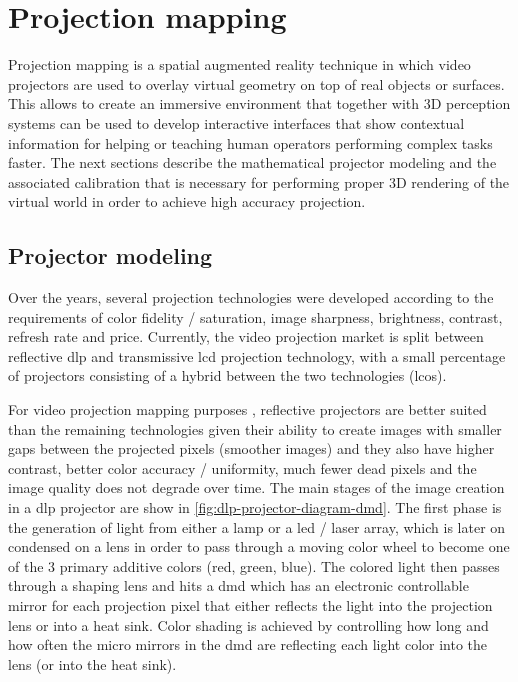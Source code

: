 \section{Projection mapping}\label{sec:projection-mapping}

Projection mapping is a spatial augmented reality \cite{Bimber2005} technique in which video projectors are used to overlay virtual geometry on top of real objects or surfaces. This allows to create an immersive environment that together with 3D perception systems can be used to develop interactive interfaces that show contextual information for helping or teaching human operators performing complex tasks faster. The next sections describe the mathematical projector modeling and the associated calibration that is necessary for performing proper 3D rendering of the virtual world in order to achieve high accuracy projection.


\subsection{Projector modeling}

Over the years, several projection technologies were developed according to the requirements of color fidelity / saturation, image sharpness, brightness, contrast, refresh rate and price. Currently, the video projection market is split between reflective \gls{dlp} and transmissive \gls{lcd} projection technology, with a small percentage of projectors consisting of a hybrid between the two technologies (\gls{lcos}).

For video projection mapping purposes \cite{Raskar1998,Bimber2005,Tan2013,Fujimoto2014}, reflective projectors are better suited than the remaining technologies given their ability to create images with smaller gaps between the projected pixels (smoother images) and they also have higher contrast, better color accuracy / uniformity, much fewer dead pixels and the image quality does not degrade over time. The main stages of the image creation in a \gls{dlp} projector are show in \cref{fig:dlp-projector-diagram-dmd}. The first phase is the generation of light from either a lamp or a \gls{led} / laser array, which is later on condensed on a lens in order to pass through a moving color wheel to become one of the 3 primary additive colors (red, green, blue). The colored light then passes through a shaping lens and hits a \gls{dmd} which has an electronic controllable mirror for each projection pixel that either reflects the light into the projection lens or into a heat sink. Color shading is achieved by controlling how long and how often the micro mirrors in the \gls{dmd} are reflecting each light color into the lens (or into the heat sink).


